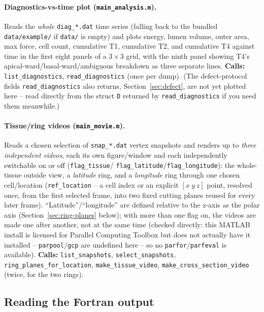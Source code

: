 \documentclass[11pt,a4paper]{report}
\begin{document}
\paragraph{Diagnostics-vs-time plot (\texttt{main\_analysis.m}).}
Reads the \emph{whole} \texttt{diag\_*.dat} time series (falling back
to the bundled \texttt{data/example/} if \texttt{data/} is empty) and
plots energy, lumen volume, outer area, max force, cell count,
cumulative T1, cumulative T2, and cumulative T4 against time in the
first eight panels of a $3\times3$ grid, with the ninth panel showing
T4's apical-ward/basal-ward/ambiguous breakdown as three separate
lines. \textbf{Calls:} \texttt{list\_diagnostics},
\texttt{read\_diagnostics} (once per dump). (The defect-protocol
fields \texttt{read\_diagnostics} also returns,
Section~\ref{sec:defect}, are not yet plotted here -- read directly
from the struct \texttt{D} returned by \texttt{read\_diagnostics} if
you need them meanwhile.)
\paragraph{Tissue/ring videos (\texttt{main\_movie.m}).} Reads a chosen
selection of \texttt{snap\_*.dat} vertex snapshots and renders up to
\emph{three independent videos}, each its own figure/window and each
independently switchable on or off (\texttt{flag\_tissue}/
\texttt{flag\_latitude}/\texttt{flag\_longitude}): the whole-tissue
outside view, a \emph{latitude} ring, and a \emph{longitude} ring
through one chosen cell/location (\texttt{ref\_location} -- a cell
index or an explicit $[x\ y\ z]$ point, resolved once, from the first
selected frame, into two fixed cutting planes reused for every later
frame). ``Latitude''/``longitude'' are defined relative to the z-axis
as the polar axis (Section~\ref{sec:ring-planes} below); with more
than one flag on, the videos are made one after another, not at the
same time (checked directly: this MATLAB install is licensed for
Parallel Computing Toolbox but does not actually have it installed --
\texttt{parpool}/\texttt{gcp} are undefined here -- so no
\texttt{parfor}/\texttt{parfeval} is available). \textbf{Calls:}
\texttt{list\_snapshots}, \texttt{select\_snapshots},
\texttt{ring\_planes\_for\_location}, \texttt{make\_tissue\_video},
\texttt{make\_cross\_section\_video} (twice, for the two rings).

\subsection{Reading the Fortran output}
\end{document}
